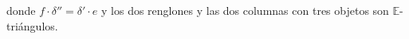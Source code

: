 \documentclass[preview]{standalone}
\begin{document}
\begin{center}
donde $f\cdot \delta'' = \delta'\cdot e$ y los dos renglones y las dos columnas con tres objetos son $\mathbb{E}$-triángulos.
\end{center}
\end{document}
